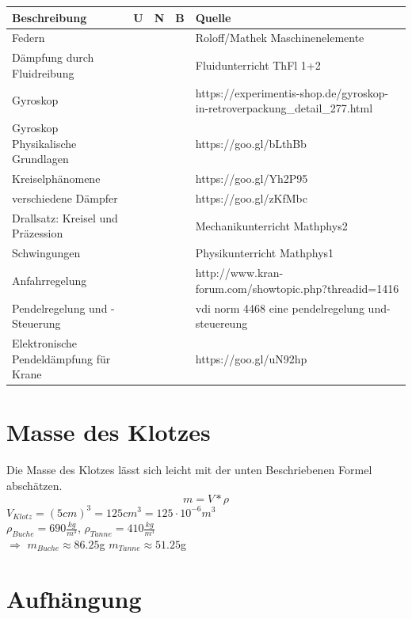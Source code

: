\documentclass[a4paper]{report}
\begin{document}
\vspace{1em}
\noindent
\begin{tabular}{|p{}|p{}|p{}|p{}|p{}|}
	\hline
	\textbf{Beschreibung} & \textbf{U} & \textbf{N} & \textbf{B} & \textbf{Quelle} \\
	\hline
	Federn & & & & Roloff/Mathek Maschinenelemente \\
	\hline
	Dämpfung durch Fluidreibung & & & & Fluidunterricht ThFl 1+2 \\
	\hline
	Gyroskop & & & & https://experimentis-shop.de/gyroskop-in-retroverpackung\_detail\_277.html \\
	\hline
	Gyroskop Physikalische Grundlagen & & & & https://goo.gl/bLthBb \\
	\hline
	Kreiselphänomene & & & & https://goo.gl/Yh2P95 \\
	\hline
	verschiedene Dämpfer & & & & https://goo.gl/zKfMbc \\
	\hline
	Drallsatz: Kreisel und Präzession & & & & Mechanikunterricht Mathphys2 \\
	\hline
	Schwingungen & & & & Physikunterricht Mathphys1 \\
	\hline
	Anfahrregelung & & & & http://www.kran-forum.com/showtopic.php?threadid=1416 \\
	\hline
	Pendelregelung und -Steuerung & & & & vdi norm 4468 eine pendelregelung und- steuereung \\
	\hline
	Elektronische Pendeldämpfung für Krane & & & & https://goo.gl/uN92hp\\
	\hline
\end{tabular}

\section{Masse des Klotzes}
\label{sec:RechKlotzMasse}
Die Masse des Klotzes lässt sich leicht mit der unten Beschriebenen Formel abschätzen.  \\
\begin{displaymath}
	m=V*\rho
\end{displaymath}
$V_{Klotz}=(5cm)^3=125cm^3=125\cdot10^{-6} m^3$ \\
$\rho_{Buche}=690\frac{kg}{m^3}$, $\rho_{Tanne}= 410\frac{kg}{m^3}$ \\
$\Rightarrow$ $m_{Buche} \approx 86.25$g \hspace*{10mm} $m_{Tanne} \approx 51.25$g

\section{Aufhängung}
\end{document}
